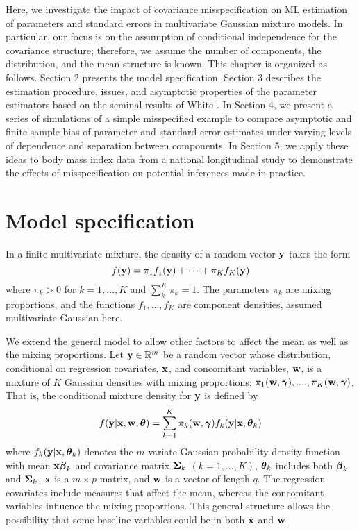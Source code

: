 Here, we investigate the impact of covariance misspecification on ML estimation of parameters and standard errors in multivariate Gaussian mixture models. In particular, our focus is on the assumption of conditional independence for the covariance structure; therefore, we assume the number of components, the distribution, and the mean structure is known. This chapter is organized as follows. Section 2 presents the model specification. Section 3 describes the estimation procedure, issues, and asymptotic properties of the parameter estimators based on the seminal results of White \cite{white1982}.  In Section 4, we present a series of simulations of a simple misspecified example to compare asymptotic and finite-sample bias of parameter and standard error estimates under varying levels of dependence and separation between components. In Section 5, we apply these ideas to body mass index data from a national longitudinal study to demonstrate the effects of misspecification on potential inferences made in practice. 

\section{Model specification}
In a finite multivariate mixture, the density of a random vector $\mathbf y$ takes the form
$$f(\mathbf y)=\pi_{1}f_{1}(\mathbf y)+\cdots+\pi_{K}f_{K}(\mathbf y)$$
where $\pi_{k}>0$ for $k=1,...,K$ and $\sum^{K}_{k}\pi_{k}=1$. The parameters $\pi_{k}$ are mixing proportions, and the functions $f_{1},...,f_{K}$ are component densities, assumed multivariate Gaussian here. 

We extend the general model to allow other factors to affect the mean as well as the mixing proportions. Let $\mathbf y\in\mathbb{R}^{m}$ be a random vector whose distribution, conditional on regression covariates, $\mathbf x$, and concomitant variables, $\mathbf w$, is a mixture of $K$ Gaussian densities with mixing proportions: $\pi_{1}(\mathbf w,\boldsymbol \gamma),....,\pi_{K}(\mathbf w,\boldsymbol \gamma)$. That is, the conditional mixture density for $\mathbf y$ is defined by
\begin{align}
f(\mathbf y|\mathbf x,\mathbf w,\boldsymbol \theta)=\sum^{K}_{k=1}\pi_{k}(\mathbf w,\boldsymbol\gamma)f_{k}(\mathbf y|\mathbf x,\boldsymbol\theta_{k}) \label{mixdens}
\end{align}
where $f_{k}(\mathbf y|\mathbf x,\boldsymbol\theta_{k})$ denotes the $m$-variate Gaussian probability density function with mean $\mathbf x\boldsymbol \beta_{k}$ and covariance matrix $\boldsymbol\Sigma_{k}$ $(k=1,...,K)$, $\boldsymbol\theta_{k}$ includes both $\boldsymbol\beta_{k}$ and $\boldsymbol\Sigma_{k}$, $\mathbf x$ is a $m\times p$ matrix, and $\mathbf w$ is a vector of length $q$. The regression covariates include measures that affect the mean, whereas the concomitant variables influence the mixing proportions. This general structure allows the possibility that some baseline variables could be in both $\mathbf x$ and $\mathbf w$. 

